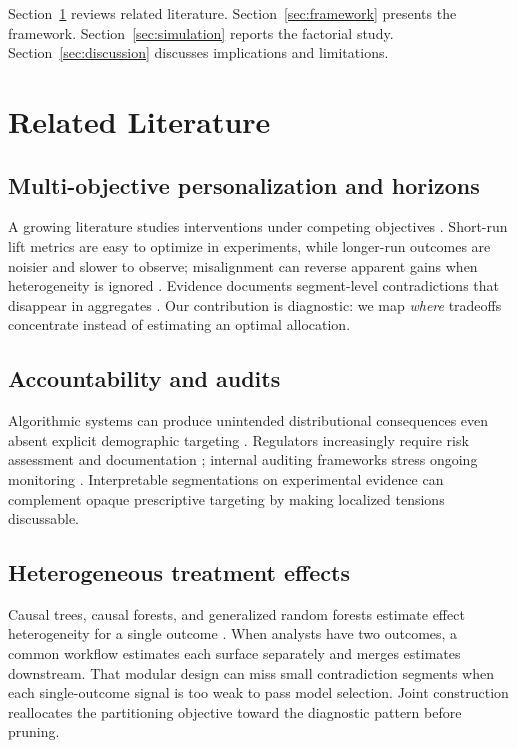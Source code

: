 \documentclass[12pt,a4paper]{article}
\begin{document}
Section~\ref{sec:related} reviews related literature. Section~\ref{sec:framework} presents the framework. Section~\ref{sec:simulation} reports the factorial study. Section~\ref{sec:discussion} discusses implications and limitations.

\section{Related Literature}
\label{sec:related}

\subsection{Multi-objective personalization and horizons}

A growing literature studies interventions under competing objectives \citep{rafieian2025multiobjective}. Short-run lift metrics are easy to optimize in experiments, while longer-run outcomes are noisier and slower to observe; misalignment can reverse apparent gains when heterogeneity is ignored \citep{ascarza2024doingmore}. Evidence documents segment-level contradictions that disappear in aggregates \citep{anderson2004longrun, hohnhold2015focusing}. Our contribution is diagnostic: we map \emph{where} tradeoffs concentrate instead of estimating an optimal allocation.

\subsection{Accountability and audits}

Algorithmic systems can produce unintended distributional consequences even absent explicit demographic targeting \citep{lambrecht2019algorithmic}. Regulators increasingly require risk assessment and documentation \citep{dsa2022article34}; internal auditing frameworks stress ongoing monitoring \citep{raji2020_internal_audit}. Interpretable segmentations on experimental evidence can complement opaque prescriptive targeting by making localized tensions discussable.

\subsection{Heterogeneous treatment effects}

Causal trees, causal forests, and generalized random forests estimate effect heterogeneity for a single outcome \citep{athey2016recursive, wager2018estimation, athey2019grf}. When analysts have two outcomes, a common workflow estimates each surface separately and merges estimates downstream. That modular design can miss small contradiction segments when each single-outcome signal is too weak to pass model selection. Joint construction reallocates the partitioning objective toward the diagnostic pattern before pruning.
\end{document}
